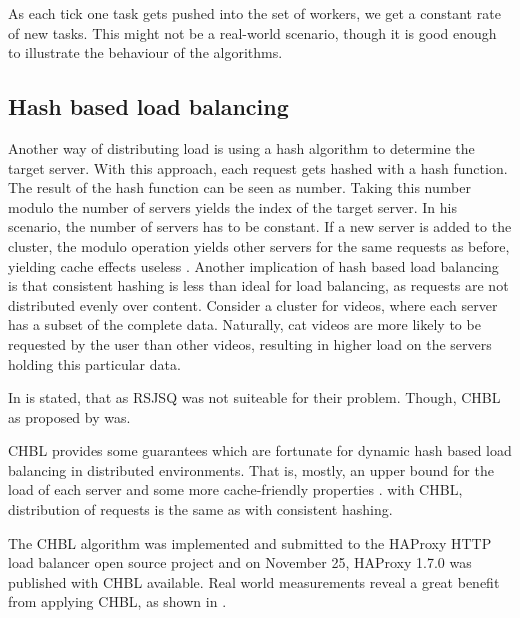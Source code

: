 As each tick one task gets pushed into the set of workers, we get a constant
rate of new tasks. This might not be a real-world scenario, though it is good
enough to illustrate the behaviour of the algorithms.

\subsection{Hash based load balancing}

Another way of distributing load is using a hash algorithm to determine the
target server.
With this approach, each request gets hashed with a hash function.
The result of the hash function can be seen as number.
Taking this number modulo the number of servers yields the index of the target
server.
In his scenario, the number of servers has to be constant.
If a new server is added to the cluster, the modulo operation yields other
servers for the same requests as before, yielding cache effects useless
\cite{medVimeoEngin}.
Another implication of hash based load balancing is that consistent hashing is
less than ideal for load balancing, as requests are not distributed evenly over
content.
Consider a cluster for videos, where each server has a subset of the complete
data.
Naturally, cat videos are more likely to be requested by the user than other
videos, resulting in higher load on the servers holding this particular data.

In \cite{medVimeoEngin} is stated, that as \ac{RSJSQ} was not suiteable for
their problem.
Though, \ac{CHBL} as proposed by \cite{ConsistentHashingWithBoundedLoads} was.

\ac{CHBL} provides some guarantees which are fortunate for dynamic hash based
load balancing in distributed environments.
That is, mostly, an upper bound for the load of each server
\cite{ConsistentHashingWithBoundedLoads}
and some more cache-friendly properties \cite{medVimeoEngin}.
with \ac{CHBL}, distribution of requests is the same as with consistent hashing.

The \ac{CHBL} algorithm was implemented and submitted to the HAProxy HTTP load
balancer open source project and on November 25, HAProxy 1.7.0 was published
with \ac{CHBL} available.
Real world measurements reveal a great benefit from applying \ac{CHBL}, as shown
in \cite{medVimeoEngin}.


